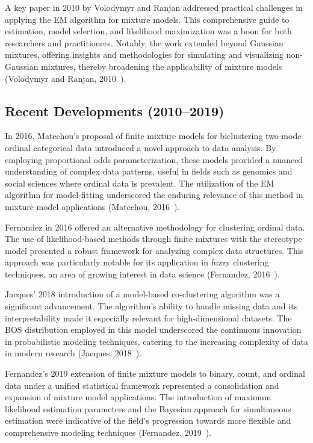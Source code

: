 \documentclass{article}
\begin{document}
A key paper in 2010 by Volodymyr and Ranjan addressed practical challenges in applying the EM algorithm for mixture models. This comprehensive guide to estimation, model selection, and likelihood maximization was a boon for both researchers and practitioners. Notably, the work extended beyond Gaussian mixtures, offering insights and methodologies for simulating and visualizing non-Gaussian mixtures, thereby broadening the applicability of mixture models (Volodymyr and Ranjan, 2010~\cite{10.1214/09-SS053}).

\subsection*{Recent Developments (2010--2019)}

In 2016, Matechou's proposal of finite mixture models for biclustering two-mode ordinal categorical data introduced a novel approach to data analysis. By employing proportional odds parameterization, these models provided a nuanced understanding of complex data patterns, useful in fields such as genomics and social sciences where ordinal data is prevalent. The utilization of the EM algorithm for model-fitting underscored the enduring relevance of this method in mixture model applications (Matechou, 2016~\cite{matechou2016biclustering}).

Fernandez in 2016 offered an alternative methodology for clustering ordinal data. The use of likelihood-based methods through finite mixtures with the stereotype model presented a robust framework for analyzing complex data structures. This approach was particularly notable for its application in fuzzy clustering techniques, an area of growing interest in data science (Fernandez, 2016~\cite{fernandez2016mixture}).

Jacques' 2018 introduction of a model-based co-clustering algorithm was a significant advancement. The algorithm's ability to handle missing data and its interpretability made it especially relevant for high-dimensional datasets. The BOS distribution employed in this model underscored the continuous innovation in probabilistic modeling techniques, catering to the increasing complexity of data in modern research (Jacques, 2018~\cite{jacques2018model}).

Fernandez's 2019 extension of finite mixture models to binary, count, and ordinal data under a unified statistical framework represented a consolidation and expansion of mixture model applications. The introduction of maximum likelihood estimation parameters and the Bayesian approach for simultaneous estimation were indicative of the field's progression towards more flexible and comprehensive modeling techniques (Fernandez, 2019~\cite{fernandez2019finite}).
\end{document}
